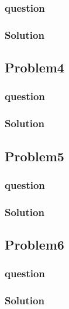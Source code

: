 \documentclass[journal,12pt,twocolumn]{IEEEtran}
\begin{document}
\subsubsection{question}

\subsubsection{Solution}


\subsection{Problem4}
\subsubsection{question}

\subsubsection{Solution}




\subsection{Problem5}
\subsubsection{question}

\subsubsection{Solution}




\subsection{Problem6}
\subsubsection{question}

\subsubsection{Solution}

\end{document}
